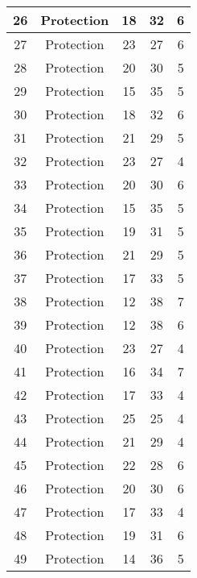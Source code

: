 \documentclass[results.tex]{subfiles}
\begin{document}
\begin{center}
\begin{tabular}{| c || c | c | c | c |}
    \hline
    26 & Protection & 18 & 32 & 6 \\ 
    \hline
    27 & Protection & 23 & 27 & 6 \\ 
    \hline
    28 & Protection & 20 & 30 & 5 \\ 
    \hline
    29 & Protection & 15 & 35 & 5 \\ 
    \hline
    30 & Protection & 18 & 32 & 6 \\ 
    \hline
    31 & Protection & 21 & 29 & 5 \\ 
    \hline
    32 & Protection & 23 & 27 & 4 \\ 
    \hline
    33 & Protection & 20 & 30 & 6 \\ 
    \hline
    34 & Protection & 15 & 35 & 5 \\ 
    \hline
    35 & Protection & 19 & 31 & 5 \\ 
    \hline
    36 & Protection & 21 & 29 & 5 \\ 
    \hline
    37 & Protection & 17 & 33 & 5 \\ 
    \hline
    38 & Protection & 12 & 38 & 7 \\ 
    \hline
    39 & Protection & 12 & 38 & 6 \\ 
    \hline
    40 & Protection & 23 & 27 & 4 \\ 
    \hline
    41 & Protection & 16 & 34 & 7 \\ 
    \hline
    42 & Protection & 17 & 33 & 4 \\ 
    \hline
    43 & Protection & 25 & 25 & 4 \\ 
    \hline
    44 & Protection & 21 & 29 & 4 \\ 
    \hline
    45 & Protection & 22 & 28 & 6 \\ 
    \hline
    46 & Protection & 20 & 30 & 6 \\ 
    \hline
    47 & Protection & 17 & 33 & 4 \\ 
    \hline
    48 & Protection & 19 & 31 & 6 \\ 
    \hline
    49 & Protection & 14 & 36 & 5 \\ 
    \hline   \end{tabular}
\end{center}
\end{document}
